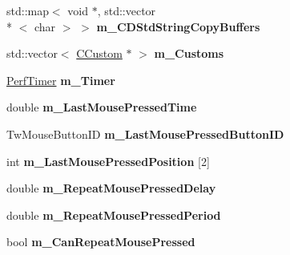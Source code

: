 \begin{DoxyCompactItemize}
\item 
\hypertarget{struct_c_tw_mgr_a21dc1ad4abfa13755bcf2beb43b5cfe4}{std\+::map$<$ void $\ast$, std\+::vector\\*
$<$ char $>$ $>$ {\bfseries m\+\_\+\+C\+D\+Std\+String\+Copy\+Buffers}}\label{struct_c_tw_mgr_a21dc1ad4abfa13755bcf2beb43b5cfe4}

\item 
\hypertarget{struct_c_tw_mgr_a124ba6e5e9f64bc7e2844cd8c55a213f}{std\+::vector$<$ \hyperlink{struct_c_tw_mgr_1_1_c_custom}{C\+Custom} $\ast$ $>$ {\bfseries m\+\_\+\+Customs}}\label{struct_c_tw_mgr_a124ba6e5e9f64bc7e2844cd8c55a213f}

\item 
\hypertarget{struct_c_tw_mgr_a135a78e2a27e84d1b0cfac2931de517f}{\hyperlink{struct_perf_timer}{Perf\+Timer} {\bfseries m\+\_\+\+Timer}}\label{struct_c_tw_mgr_a135a78e2a27e84d1b0cfac2931de517f}

\item 
\hypertarget{struct_c_tw_mgr_ae21be0539c2c24eef7b6c3157910705d}{double {\bfseries m\+\_\+\+Last\+Mouse\+Pressed\+Time}}\label{struct_c_tw_mgr_ae21be0539c2c24eef7b6c3157910705d}

\item 
\hypertarget{struct_c_tw_mgr_a677a17092a10d62dbf757319db89dbda}{Tw\+Mouse\+Button\+I\+D {\bfseries m\+\_\+\+Last\+Mouse\+Pressed\+Button\+I\+D}}\label{struct_c_tw_mgr_a677a17092a10d62dbf757319db89dbda}

\item 
\hypertarget{struct_c_tw_mgr_a07f53d2ce624d2fed9928ca29ae536e2}{int {\bfseries m\+\_\+\+Last\+Mouse\+Pressed\+Position} \mbox{[}2\mbox{]}}\label{struct_c_tw_mgr_a07f53d2ce624d2fed9928ca29ae536e2}

\item 
\hypertarget{struct_c_tw_mgr_a19aead5381769737ab20c3641a3ace75}{double {\bfseries m\+\_\+\+Repeat\+Mouse\+Pressed\+Delay}}\label{struct_c_tw_mgr_a19aead5381769737ab20c3641a3ace75}

\item 
\hypertarget{struct_c_tw_mgr_a367a55c683a2bfb02f9ceaca4e370511}{double {\bfseries m\+\_\+\+Repeat\+Mouse\+Pressed\+Period}}\label{struct_c_tw_mgr_a367a55c683a2bfb02f9ceaca4e370511}

\item 
\hypertarget{struct_c_tw_mgr_a290bd6a754e96a854b3c0e63d3ef5c9a}{bool {\bfseries m\+\_\+\+Can\+Repeat\+Mouse\+Pressed}}\label{struct_c_tw_mgr_a290bd6a754e96a854b3c0e63d3ef5c9a}


\end{DoxyCompactItemize}
